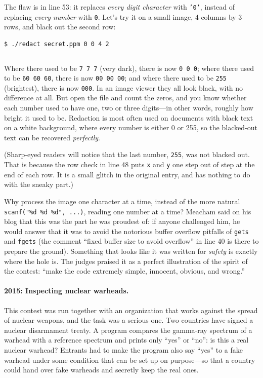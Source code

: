 The flaw is in line 53: it replaces \emph{every digit character} with \texttt{'0'}, instead of replacing \emph{every number} with \texttt{0}. Let's try it on a small image, 4 columns by 3 rows, and black out the second row:
\begin{verbatim}
$ ./redact secret.ppm 0 0 4 2
\end{verbatim}
\inputminted[linenos=false]{text}{code/en/appc/out/redacted.ppm}

Where there used to be \texttt{7 7 7} (very dark), there is now \texttt{0 0 0}; where there used to be \texttt{60 60 60}, there is now \texttt{00 00 00}; and where there used to be \texttt{255} (brightest), there is now \texttt{000}. In an image viewer they all look black, with no difference at all. But open the file and count the zeros, and you know whether each number used to have one, two or three digits---in other words, roughly how bright it used to be. Redaction is most often used on documents with black text on a white background, where every number is either 0 or 255, so the blacked-out text can be recovered \emph{perfectly}.

(Sharp-eyed readers will notice that the last number, \texttt{255}, was not blacked out. That is because the row check in line 48 puts \texttt{x} and \texttt{y} one step out of step at the end of each row. It is a small glitch in the original entry, and has nothing to do with the sneaky part.)

Why process the image one character at a time, instead of the more natural \texttt{scanf("\%d \%d \%d", ...)}, reading one number at a time? Meacham said on his blog that this was the part he was proudest of: if anyone challenged him, he would answer that it was to avoid the notorious buffer overflow pitfalls of \texttt{gets} and \texttt{fgets} (the comment ``fixed buffer size to avoid overflow'' in line 40 is there to prepare the ground). Something that looks like it was written for \emph{safety} is exactly where the hole is. The judges praised it as a perfect illustration of the spirit of the contest: ``make the code extremely simple, innocent, obvious, and wrong.''

\paragraph{2015: Inspecting nuclear warheads.}
This contest was run together with an organization that works against the spread of nuclear weapons, and the task was a serious one. Two countries have signed a nuclear disarmament treaty. A program compares the gamma-ray spectrum of a warhead with a reference spectrum and prints only ``yes'' or ``no'': is this a real nuclear warhead? Entrants had to make the program also say ``yes'' to a fake warhead under some condition that can be set up on purpose---so that a country could hand over fake warheads and secretly keep the real ones.

